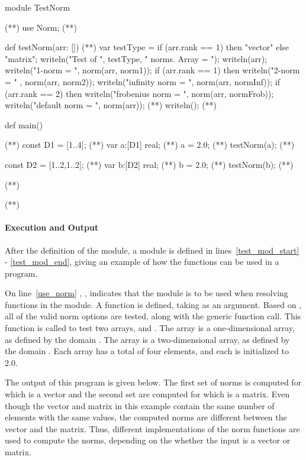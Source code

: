 \begin{numberedchapel}
module TestNorm { (*\label{test_mod_start}*)
  use Norm;  (*\label{use_norm}*)

  def testNorm(arr: []) { (*\label{test_start}*)
    var testType = if (arr.rank == 1) then "vector" else "matrix"; 
    writeln("Test of ", testType, " norms.  Array = ");
    writeln(arr);
    writeln("1-norm = ", norm(arr, norm1));
    if (arr.rank == 1) then
      writeln("2-norm = " , norm(arr, norm2));
    writeln("infinity norm = ", norm(arr, normInf));
    if (arr.rank == 2) then
      writeln("frobenius norm = ", norm(arr, normFrob));
    writeln("default norm = ", norm(arr)); (*\label{default_call}*)
    writeln();
  } (*\label{test_end}*)

  def main() {  (*\label{test_main_start}*)
    const D1 = [1..4];  (*\label{test_d1_def}*)
    var a:[D1] real;    (*\label{test_a_def}*)
    a = 2.0;            (*\label{test_a_init}*)
    testNorm(a);        (*\label{testnorm_a_call}*)

    const D2 = [1..2,1..2];  (*\label{test_d2_def}*)
    var b:[D2] real;         (*\label{test_b_def}*)
    b = 2.0;                 (*\label{test_b_init}*)
    testNorm(b);             (*\label{testnorm_b_call}*)
  }            (*\label{test_main_end}*)
}              (*\label{test_mod_end}*)
\end{numberedchapel}

\paragraph{Execution and Output}
After the definition of the  module, a  module
is defined in lines~\ref{test_mod_start} - \ref{test_mod_end}, giving 
an example of how the  functions can be used in a program.

On line~\ref{use_norm} , , indicates that the  module is to be
used when resolving functions in the  module.  A 
function is defined, taking  as an argument.  Based on ,
all of the valid norm options are tested, along with the generic 
function call.  This  function is called to test two arrays, 
and .  The array  is a one-dimensional array, as defined by the
domain .  The array  is a two-dimensional array, as defined by
the domain .  Each array has a total of four elements, and each
is initialized to 2.0.  

The output of this program is given below.  The first set
of norms is computed for  which is a vector and the second set 
are computed for  which is
a matrix. Even though the vector and matrix in this example contain
the same number of elements with the same values, the computed norms
are different between the vector and the matrix.  Thus, different
implementations of the norm functions are used to compute the norms, 
depending on the whether the input is a vector or matrix.

